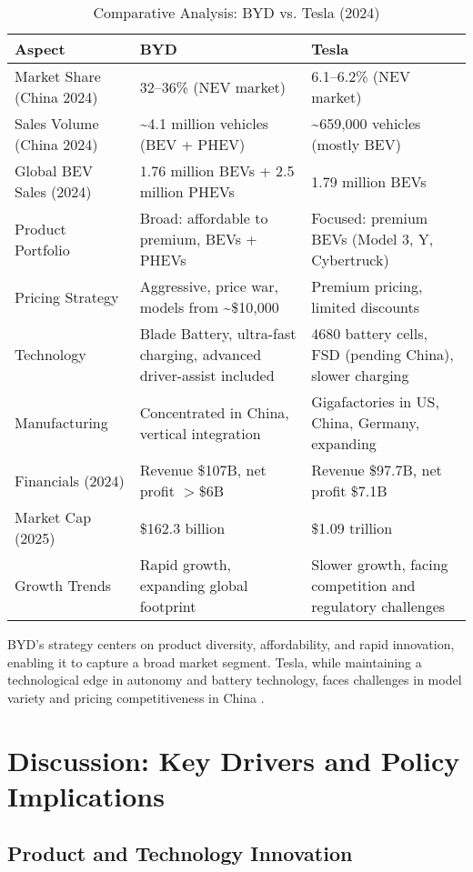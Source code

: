 \documentclass{article}
\begin{document}
\begin{table}[ht]
\centering
\caption{Comparative Analysis: BYD vs. Tesla (2024)}
\label{tab:comparison}
\begin{tabularx}{\textwidth}{l l l}
\toprule
Aspect & BYD & Tesla \\
\midrule
Market Share (China 2024) & 32--36\% (NEV market) & 6.1--6.2\% (NEV market) \\
Sales Volume (China 2024) & \textasciitilde4.1 million vehicles (BEV + PHEV) & \textasciitilde659,000 vehicles (mostly BEV) \\
Global BEV Sales (2024) & 1.76 million BEVs + 2.5 million PHEVs & 1.79 million BEVs \\
Product Portfolio & Broad: affordable to premium, BEVs + PHEVs & Focused: premium BEVs (Model 3, Y, Cybertruck) \\
Pricing Strategy & Aggressive, price war, models from \textasciitilde\$10,000 & Premium pricing, limited discounts \\
Technology & Blade Battery, ultra-fast charging, advanced driver-assist included & 4680 battery cells, FSD (pending China), slower charging \\
Manufacturing & Concentrated in China, vertical integration & Gigafactories in US, China, Germany, expanding \\
Financials (2024) & Revenue \$107B, net profit $>$\$6B & Revenue \$97.7B, net profit \$7.1B \\
Market Cap (2025) & \$162.3 billion & \$1.09 trillion \\
Growth Trends & Rapid growth, expanding global footprint & Slower growth, facing competition and regulatory challenges \\
\bottomrule
\end{tabularx}
\end{table}

BYD's strategy centers on product diversity, affordability, and rapid innovation, enabling it to capture a broad market segment. Tesla, while maintaining a technological edge in autonomy and battery technology, faces challenges in model variety and pricing competitiveness in China \citep{teslarati2025, scmp2024, cnn2025}.

\section{Discussion: Key Drivers and Policy Implications}

\subsection{Product and Technology Innovation}
\end{document}
